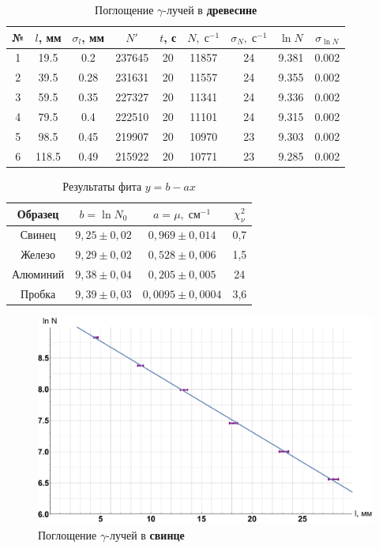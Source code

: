 \documentclass[12pt]{kiarticle}
\newcommand{\ga}{\ensuremath{\gamma}}
\begin{document}
\begin{table}[h!]
	\caption{Поглощение \ga-лучей в \textbf{древесине}}
	\begin{center}
		\begin{tabular}{|c|c|c|c|c|c|c|c|c|}
			\hline
			№ & $ l $, мм & $ \sigma_l $, мм & $ N' $ & $ t $, с & $ N, \; с^{-1}$  & $ \sigma_N, \; с^{-1}$ & $ \ln N $ & $ \sigma_{\ln N} $ \\
			\hline
		1 & 19.5 & 0.2 & 237645 & 20 & 11857 & 24 & 9.381 & 0.002 \\
		2 & 39.5 & 0.28 & 231631 & 20 & 11557 & 24 & 9.355 & 0.002 \\
		3 & 59.5 & 0.35 & 227327 & 20 & 11341 & 24 & 9.336 & 0.002 \\
		4 & 79.5 & 0.4 & 222510 & 20 & 11101 & 24 & 9.315 & 0.002 \\
		5 & 98.5 & 0.45 & 219907 & 20 & 10970 & 23 & 9.303 & 0.002 \\
		6 & 118.5 & 0.49 & 215922 & 20 & 10771 & 23 & 9.285 & 0.002 \\
			\hline
		\end{tabular}
	\end{center}
	\label{table_4}
\end{table}


 \begin{table}[h!]
	\caption{Результаты фита $ y = b - ax $}
	\begin{center}
		\begin{tabular}{|c|c|c|c|}
			\hline
			Образец  &  $ b = \ln N_0 $  & $ a = \mu, \; см^{-1} $ & $ \chi^2_\nu $ \\ \hline
			Свинец  & $ 9,25	\pm	0,02 $ &   $ 0,969	\pm	0,014 $   &   0,7    \\
			Железо  & $ 9,29	\pm	0,02 $ &   $ 0,528	\pm	0,006 $   &    1,5        \\
			Алюминий & $ 9,38	\pm	0,04 $ &   $ 0,205	\pm	0,005 $   &   24         \\
			Пробка  & $ 9,39	\pm	0,03 $ &  $ 0,0095	\pm	0,0004 $  &    3,6        \\ \hline
		\end{tabular}
	\end{center}
	\label{table_5}
\end{table}


\begin{figure}[h!]
	\label{graf_pb}
	\includegraphics[scale=0.47]{pb.pdf}
	\caption{Поглощение \ga-лучей в \textbf{свинце}}
\end{figure}
\end{document}
